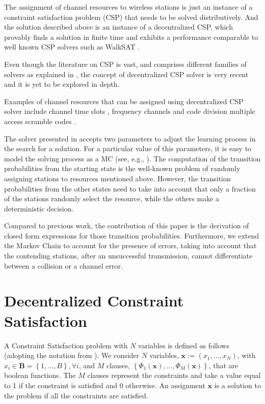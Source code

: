 \documentclass[journal]{IEEEtran}
\begin{document}
The assignment of channel resources to wireless stations is just an instance of a constraint satisfaction problem (CSP) \cite{duffy2011dcs} that needs to be solved distributively.
And the solution described above is an instance of a decentralized CSP, which provably finds a solution in finite time and exhibits a performance comparable to well known CSP solvers such as WalkSAT \cite{selman1993lss}.

Even though the literature on CSP is vast, and comprises different families of solvers as explained in \cite{duffy2011dcs}, the concept of decentralized CSP solver is very recent and it is yet to be explored in depth.

Examples of channel resources that can be assigned using decentralized CSP solver include channel time slots \cite{barcelo2008lba}, frequency channels \cite{duffy2011dcs} and code division multiple access scramble codes \cite{checco2012scs}.

The solver presented in \cite{duffy2011dcs} accepts two parameters to adjust the learning process in the search for a solution.
For a particular value of this parameters, it is easy to model the solving process as a MC (see, e.g., \cite{barcelo2010fcc, he2009srb, fang2011dlm}).
The computation of the transition probabilities from the starting state is the well-known problem of randomly assigning stations to resources mentioned above.
However, the transition probabilities from the other states need to take into account that only a fraction of the stations randomly select the resource, while the others make a deterministic decision.

Compared to previous work, the contribution of this paper is the derivation of closed form expressions for those transition probabilities.
Furthermore, we extend the Markov Chain to account for the presence of errors, taking into account that the contending stations, after an unsuccessful transmission, cannot differentiate between a collision or a channel error.

\section{Decentralized Constraint Satisfaction}
\label{sec:dcs}
A Constraint Satisfaction problem with $N$ variables is defined as follows (adopting the notation from \cite{duffy2011dcs}).
We consider $N$ variables,  \mbox{$\mathbf{x} := (x_1,\dots,x_N)$}, with $x_i \in \mathbf{B}=\left\{1, \dots, B \right\}, \forall i $, and $M$ clauses, $\left\{ \Phi_1(\mathbf{x}),\dots,\Phi_M(\mathbf{x}) \right\}$, that are boolean functions.
The $M$ clauses represent the constraints and take a value equal to 1 if the constraint is satisfied and 0 otherwise.
An assignment $\mathbf{x}$ is a solution to the problem if all the constraints are satisfied.
\end{document}

